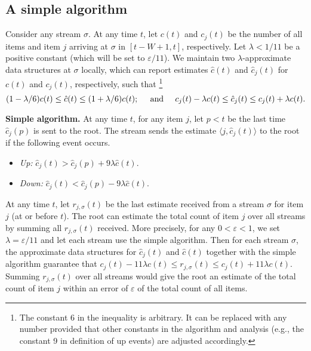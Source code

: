 \documentclass[proceedings]{stacs}
\theoremstyle{definition}\newtheorem{fact}{Fact}
\newcommand{\ns}{c}
\newcommand{\hns}{\hat c}
\newcommand{\cjs}{c_{j}}
\newcommand{\hcjs}{\hat c_{j}}
\newcommand{\rjs}{r_{j,\sigma}}
\begin{document}
\subsection{A simple algorithm}
\label{sect:simpleAlg}
Consider any stream $\sigma$.  At any time $t$,
let $\ns(t)$ and $\cjs(t)$ be the number of all items and item $j$
arriving at $\sigma$ in $[t-W+1, t]$, respectively.
Let $\lambda < 1/11$ be a positive constant
(which will be set to $\varepsilon/11$).
We maintain two $\lambda$-approximate data structures \cite{DatarGIM02,LeeT06}
at $\sigma$ locally,
which can report estimates $\hns(t)$ and $\hcjs(t)$ for
$\ns(t)$ and $\cjs(t)$, respectively,
such that
\footnote{
The constant 6 in the inequality is arbitrary.
It can be replaced with any number provided that
other constants in the algorithm and analysis
(e.g., the constant 9 in definition of up events)
are adjusted accordingly.
}
$$
(1 - \lambda / 6)\ns(t) \le \hns(t) \le (1+\lambda / 6) \ns(t);
\mbox{ \hspace{.1in} and \hspace{.1in} }
\cjs(t) - \lambda \ns(t) \le \hcjs(t) \le \cjs(t) + \lambda \ns(t).
$$


\vspace{.5ex}
\begin{center}
\begin{minipage}{.9\textwidth}
\hrulefill

{\bf Simple algorithm.}
At any time $t$, for any item $j$,
let $p < t$ be the last time $\hcjs(p)$ is sent
to the root. The stream sends the estimate $\langle j,
\hcjs(t)\rangle$
to the root if the following event occurs.
\begin{itemize}
\item
{\it Up:}\hspace*{3.1ex}  $\hcjs(t) > \hcjs(p) + 9\lambda \hns(t)$.

\item
{\it Down:}  $\hcjs(t) < \hcjs(p) - 9\lambda \hns(t)$.
\end{itemize}
\vspace*{-.1in}
\hrulefill
\end{minipage}
\end{center}


\vspace{1ex}
At any time $t$,
let $\rjs(t)$ be the last estimate received from a stream
$\sigma$ for item $j$ (at or before $t$).  The root can estimate
the total count of item $j$ over all streams by
summing all $\rjs(t)$ received.
More precisely, for any $0 < \varepsilon < 1$,
we set $\lambda = \varepsilon / 11$ and let each stream
use the simple algorithm.
Then for each stream $\sigma$,
the approximate data structures for $\hat c_j(t)$ and
$\hns(t)$ together with the simple algorithm guarantee that
$
  \cjs(t) -11 \lambda \ns(t) \le \rjs(t) \le \cjs(t) + 11 \lambda \ns(t).
$
Summing $\rjs(t)$ over all streams
would give the root an estimate of the total count of item $j$
within an error of $\varepsilon$ of the total count of all items.
\end{document}
